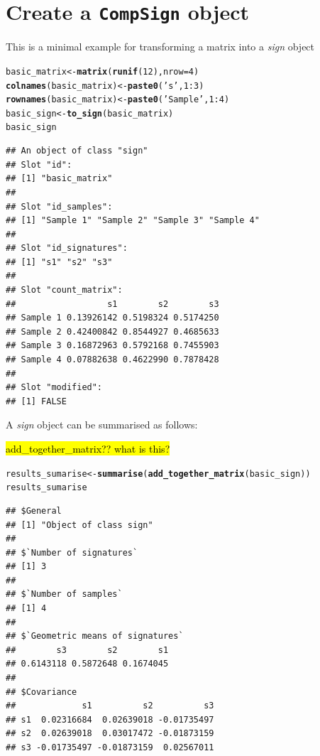 \documentclass{article}\usepackage[]{graphicx}\usepackage[]{color}
\makeatletter
\newcommand{\hlnum}[1]{\textcolor[rgb]{0.686,0.059,0.569}{#1}}%
\newcommand{\hlstr}[1]{\textcolor[rgb]{0.192,0.494,0.8}{#1}}%
\newcommand{\hlopt}[1]{\textcolor[rgb]{0,0,0}{#1}}%
\newcommand{\hlstd}[1]{\textcolor[rgb]{0.345,0.345,0.345}{#1}}%
\newcommand{\hlkwb}[1]{\textcolor[rgb]{0.69,0.353,0.396}{#1}}%
\newcommand{\hlkwc}[1]{\textcolor[rgb]{0.333,0.667,0.333}{#1}}%
\newcommand{\hlkwd}[1]{\textcolor[rgb]{0.737,0.353,0.396}{\textbf{#1}}}%
\newenvironment{kframe}{%
 \def\at@end@of@kframe{}%
 \ifinner\ifhmode%
  \def\at@end@of@kframe{\end{minipage}}%
  \begin{minipage}{\columnwidth}%
 \fi\fi%
 \def\FrameCommand##1{\hskip\@totalleftmargin \hskip-\fboxsep
 \colorbox{shadecolor}{##1}\hskip-\fboxsep
     \hskip-\linewidth \hskip-\@totalleftmargin \hskip\columnwidth}%
 \MakeFramed {\advance\hsize-\width
   \@totalleftmargin\z@ \linewidth\hsize
   \@setminipage}}%
 {\par\unskip\endMakeFramed%
 \at@end@of@kframe}
\newenvironment{knitrout}{}{} %
\makeatother
\begin{document}
\section{Create a \texttt{CompSign} object}
This is a minimal example for transforming a matrix into a \emph{sign} object
\begin{knitrout}
\color{fgcolor}\begin{kframe}
\begin{alltt}
\hlstd{basic_matrix} \hlkwb{<-} \hlkwd{matrix}\hlstd{(}\hlkwd{runif}\hlstd{(}\hlnum{12}\hlstd{),} \hlkwc{nrow} \hlstd{=} \hlnum{4}\hlstd{)}
\hlkwd{colnames}\hlstd{(basic_matrix)} \hlkwb{<-} \hlkwd{paste0}\hlstd{(}\hlstr{'s'}\hlstd{,} \hlnum{1}\hlopt{:}\hlnum{3}\hlstd{)}
\hlkwd{rownames}\hlstd{(basic_matrix)} \hlkwb{<-} \hlkwd{paste0}\hlstd{(}\hlstr{'Sample '}\hlstd{,} \hlnum{1}\hlopt{:}\hlnum{4}\hlstd{)}
\hlstd{basic_sign} \hlkwb{<-} \hlkwd{to_sign}\hlstd{(basic_matrix)}
\hlstd{basic_sign}
\end{alltt}
\begin{verbatim}
## An object of class "sign"
## Slot "id":
## [1] "basic_matrix"
## 
## Slot "id_samples":
## [1] "Sample 1" "Sample 2" "Sample 3" "Sample 4"
## 
## Slot "id_signatures":
## [1] "s1" "s2" "s3"
## 
## Slot "count_matrix":
##                  s1        s2        s3
## Sample 1 0.13926142 0.5198324 0.5174250
## Sample 2 0.42400842 0.8544927 0.4685633
## Sample 3 0.16872963 0.5792168 0.7455903
## Sample 4 0.07882638 0.4622990 0.7878428
## 
## Slot "modified":
## [1] FALSE
\end{verbatim}
\end{kframe}
\end{knitrout}

A \emph{sign} object can be summarised as follows:

\hl{add\_together\_matrix?? what is this?}

\begin{knitrout}
\color{fgcolor}\begin{kframe}
\begin{alltt}
\hlstd{results_sumarise} \hlkwb{<-} \hlkwd{summarise}\hlstd{(}\hlkwd{add_together_matrix}\hlstd{(basic_sign))}
\hlstd{results_sumarise}
\end{alltt}
\begin{verbatim}
## $General
## [1] "Object of class sign"
## 
## $`Number of signatures`
## [1] 3
## 
## $`Number of samples`
## [1] 4
## 
## $`Geometric means of signatures`
##        s3        s2        s1 
## 0.6143118 0.5872648 0.1674045 
## 
## $Covariance
##             s1          s2          s3
## s1  0.02316684  0.02639018 -0.01735497
## s2  0.02639018  0.03017472 -0.01873159
## s3 -0.01735497 -0.01873159  0.02567011
\end{verbatim}
\end{kframe}
\end{knitrout}
\end{document}
